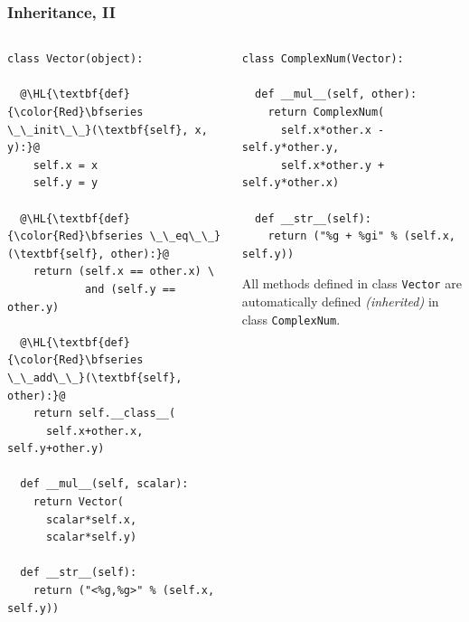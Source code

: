 \documentclass[english,serif,mathserif,xcolor=pdftex,dvipsnames,table]{beamer}
\begin{document}
\begin{frame}[fragile]
  \frametitle{Inheritance, II}

  \begin{columns}[t]
    \begin{column}{0.5\textwidth}
\begin{lstlisting}[basicstyle=\tiny\ttfamily,showstringspaces=false]
class Vector(object):

  @\HL{\textbf{def} {\color{Red}\bfseries \_\_init\_\_}(\textbf{self}, x, y):}@
    self.x = x
    self.y = y

  @\HL{\textbf{def} {\color{Red}\bfseries \_\_eq\_\_}(\textbf{self}, other):}@
    return (self.x == other.x) \
            and (self.y == other.y)

  @\HL{\textbf{def} {\color{Red}\bfseries \_\_add\_\_}(\textbf{self}, other):}@
    return self.__class__(
      self.x+other.x, self.y+other.y)

  def __mul__(self, scalar):
    return Vector(
      scalar*self.x,
      scalar*self.y)

  def __str__(self):
    return ("<%g,%g>" % (self.x, self.y))
\end{lstlisting}
    \end{column}
    \begin{column}{0.5\textwidth}
\begin{lstlisting}[basicstyle=\tiny\ttfamily,showstringspaces=false]
class ComplexNum(Vector):

  def __mul__(self, other):
    return ComplexNum(
      self.x*other.x - self.y*other.y,
      self.x*other.y + self.y*other.x)

  def __str__(self):
    return ("%g + %gi" % (self.x, self.y))
\end{lstlisting}

      \+
  All methods defined in class \texttt{Vector} are automatically
  defined \emph{(inherited)} in class \texttt{ComplexNum}.
    \end{column}
  \end{columns}
\end{frame}
\end{document}
